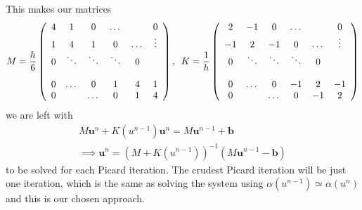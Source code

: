 \documentclass[a4paper,english, 10pt, twoside]{article}
\begin{document}
This makes our matrices
\begin{equation*}
 M = \frac{h}{6}\left(\begin{array}{c c c c c c}
    4 & 1 & 0 & \dots & & 0 \\
    1 & 4 & 1 & 0 &\dots & \vdots \\
    0 & \ddots & \ddots & \ddots & 0& \\
     & & & & & \\
     0 & \dots & 0 & 1 & 4 & 1\\
     0 & & \dots & 0 & 1 & 4
 \end{array}\right), \:\;
 K = \frac{1}{h}\left(\begin{array}{c c c c c c}
          2 & -1 & 0 & \dots & & 0 \\
	  -1 & 2 & -1 & 0 &\dots & \vdots \\
	  0 & \ddots & \ddots & \ddots & 0& \\
	  & & & & & \\
	  0 & \dots & 0 & -1 & 2 & -1\\
	  0 & & \dots & 0 & -1 & 2
                      \end{array}\right)
\end{equation*}
we are left with
\begin{align*}
M\mathbf{u}^n + K(u^{n-1})\mathbf{u}^n = M\mathbf{u}^{n-1} + \mathbf{b}\\
\implies \mathbf{u}^n = (M+K(u^{n-1}))^{-1}(M\mathbf{u}^{n-1} -\mathbf{b})
\end{align*}
to be solved for each Picard iteration. The crudest Picard iteration will be just one iteration, which is the same as solving the system using
$\alpha(u^{n-1})\simeq\alpha(u^n)$ and this is our chosen approach.
\end{document}
